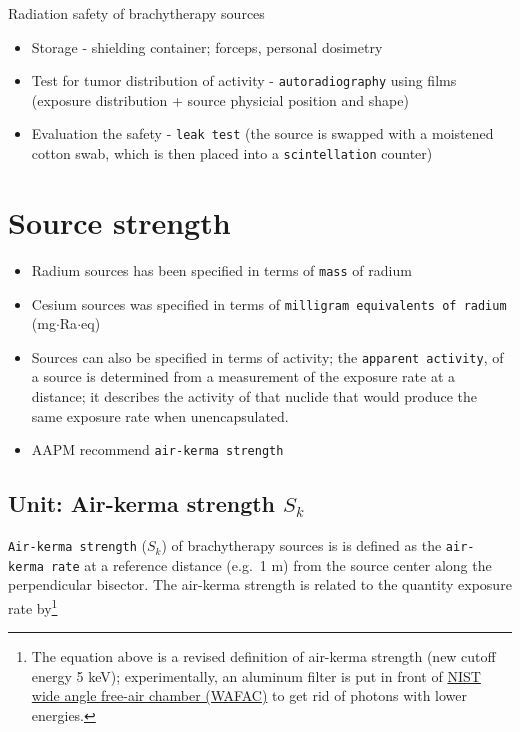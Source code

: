\documentclass[]{book}
\providecommand{\tightlist}{%
  \setlength{\itemsep}{0pt}\setlength{\parskip}{0pt}}
\let\rmarkdownfootnote\footnote%
\def\footnote{\protect\rmarkdownfootnote}
\theoremstyle{definition}
\theoremstyle{definition}
\theoremstyle{definition}
\theoremstyle{remark}
\begin{document}
Radiation safety of brachytherapy sources

\begin{itemize}
\tightlist
\item
  Storage - shielding container; forceps, personal dosimetry
\item
  Test for tumor distribution of activity - \texttt{autoradiography}
  using films (exposure distribution + source physicial position and
  shape)
\item
  Evaluation the safety - \texttt{leak\ test} (the source is swapped
  with a moistened cotton swab, which is then placed into a
  \texttt{scintellation} counter)
\end{itemize}

\section{Source strength}\label{source-strength}

\begin{itemize}
\tightlist
\item
  Radium sources has been specified in terms of \texttt{mass} of radium
\item
  Cesium sources was specified in terms of
  \texttt{milligram\ equivalents\ of\ radium} (mg\(\cdot\)Ra\(\cdot\)eq)
\item
  Sources can also be specified in terms of activity; the
  \texttt{apparent\ activity}, of a source is determined from a
  measurement of the exposure rate at a distance; it describes the
  activity of that nuclide that would produce the same exposure rate
  when unencapsulated.
\item
  AAPM recommend \texttt{air-kerma\ strength}
\end{itemize}

\subsection{\texorpdfstring{Unit: Air-kerma strength
\(S_k\)}{Unit: Air-kerma strength S\_k}}\label{sk}

\texttt{Air-kerma\ strength} (\(S_k\)) of brachytherapy sources is is
defined as the \texttt{air-kerma\ rate} at a reference distance (e.g.~1
m) from the source center along the perpendicular bisector. The
air-kerma strength is related to the quantity exposure rate by\footnote{The
  equation above is a revised definition of air-kerma strength (new
  cutoff energy 5 keV); experimentally, an aluminum filter is put in
  front of
  \href{https://www.nist.gov/programs-projects/calibration-low-energy-photon-brachytherapy-sources}{NIST
  wide angle free-air chamber (WAFAC)} to get rid of photons with lower
  energies.}
\end{document}
